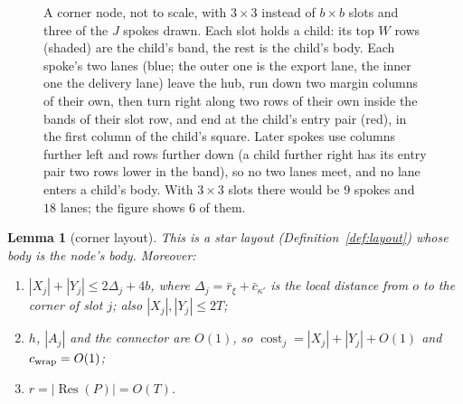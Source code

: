 \documentclass[11pt]{amsart}
\newtheorem{lemma}[theorem]{Lemma}
\theoremstyle{definition}
\newcommand{\Res}{\operatorname{Res}}
\newcommand{\cost}{\operatorname{cost}}
\begin{document}
\begin{figure}[ht]
\centering
{}
\caption{A corner node, not to scale, with $3\times3$ instead of $b\times b$ slots and three of the $J$ spokes drawn.
Each slot holds a child: its top $W$ rows (shaded) are the child's band, the rest is the child's body. Each spoke's two
lanes (blue; the outer one is the export lane, the inner one the delivery lane) leave the hub, run down two margin columns of their own, then turn right along two rows of their own inside
the bands of their slot row, and end at the child's entry pair (red), in the first column of the child's square. Later spokes
use columns further left and rows further down (a child further right has its entry pair two rows lower in the band), so
no two lanes meet, and no lane enters a child's body. With $3\times3$ slots there would be $9$ spokes and $18$ lanes; the
figure shows $6$ of them.}\label{fig:corner}
\end{figure}

\begin{lemma}[corner layout]\label{lem:corner}
This is a star layout (Definition~\ref{def:layout}) whose body is the node's body. Moreover:
\begin{enumerate}[nosep]
\item $|X_j|+|Y_j|\le2\Delta_j+4b$, where $\Delta_j=\bar r_\xi+\bar c_{\kappa'}$ is the local distance from $o$ to the corner of slot
  $j$; also $|X_j|,|Y_j|\le2T$;
\item $h$, $|A_j|$ and the connector are $O(1)$, so $\cost_j=|X_j|+|Y_j|+O(1)$ and $c_{\rm wrap}=O(1)$;
\item $r=|\Res(P)|=O(T)$.
\end{enumerate}
\end{lemma}
\end{document}
